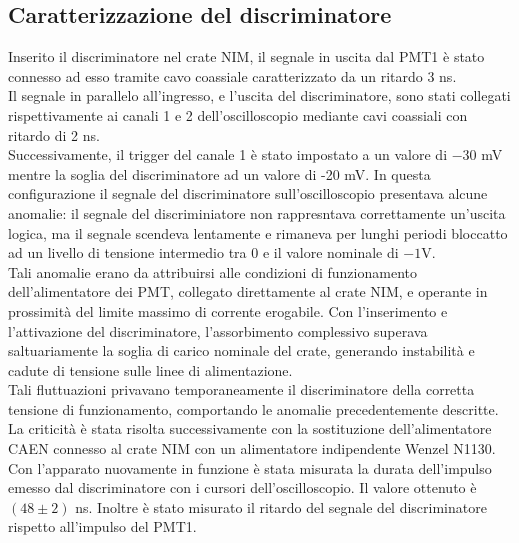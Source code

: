 \documentclass[10pt,a4paper]{article}
\begin{document}
\subsection{Caratterizzazione del discriminatore}
Inserito il discriminatore nel crate NIM, il segnale in uscita dal PMT1 è stato connesso ad esso tramite cavo coassiale caratterizzato da un ritardo 3 ns. \\Il segnale in parallelo all'ingresso, e l'uscita del discriminatore, sono stati collegati rispettivamente ai canali 1 e 2 dell'oscilloscopio mediante cavi coassiali con ritardo di 2 ns.\\
Successivamente, il trigger del canale 1 è stato impostato a un valore di $-30 $ mV mentre la soglia del discriminatore ad un valore di -20 mV.
\singlespacing 
In questa configurazione il segnale del discriminatore sull'oscilloscopio presentava alcune anomalie: il segnale del discriminiatore non rappresntava correttamente un'uscita logica, ma il segnale scendeva lentamente e rimaneva per lunghi periodi bloccatto ad un livello di tensione intermedio tra 0 e il valore nominale di $-1 $V.\\[6pt]
Tali anomalie erano da attribuirsi alle condizioni di funzionamento dell'alimentatore dei PMT, collegato direttamente al crate NIM, e operante in prossimità del limite massimo di corrente erogabile.
Con l'inserimento e l'attivazione del discriminatore, l'assorbimento complessivo superava saltuariamente la soglia di carico nominale del crate, generando instabilità e cadute di tensione sulle linee di alimentazione. \\Tali fluttuazioni privavano temporaneamente il discriminatore della corretta tensione di funzionamento, comportando le anomalie precedentemente descritte.\\[6pt]
La criticità è stata risolta successivamente con la sostituzione dell'alimentatore CAEN connesso al crate NIM con un alimentatore indipendente Wenzel N1130.\\[6pt]
Con l'apparato nuovamente in funzione è stata misurata la durata dell'impulso emesso dal discriminatore con i cursori dell'oscilloscopio. Il valore ottenuto è $(48 \pm 2) $ ns.
Inoltre è stato misurato il ritardo del segnale del discriminatore rispetto all'impulso del PMT1.
\end{document}
